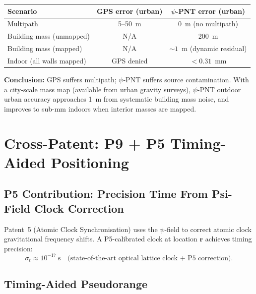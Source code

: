 \documentclass[aps,prd,twocolumn,superscriptaddress,nofootinbib]{revtex4-2}
\begin{document}
\begin{center}
\begin{tabular}{lcc}
\toprule
Scenario & GPS error (urban) & $\psi$-PNT error (urban) \\
\midrule
Multipath & 5--50~m & 0~m (no multipath) \\
Building mass (unmapped) & N/A & 200~m \\
Building mass (mapped) & N/A & $\sim 1$~m (dynamic residual) \\
Indoor (all walls mapped) & GPS denied & $< 0.31$~mm \\
\bottomrule
\end{tabular}
\end{center}

\textbf{Conclusion:} GPS suffers multipath; $\psi$-PNT suffers source
contamination.  With a city-scale mass map (available from urban
gravity surveys), $\psi$-PNT outdoor urban accuracy approaches 1~m
from systematic building mass noise, and improves to sub-mm indoors
when interior masses are mapped.

\section{Cross-Patent: P9 + P5 Timing-Aided Positioning}
\label{sec:p9p5}

\subsection{P5 Contribution: Precision Time From Psi-Field Clock Correction}

Patent~5 (Atomic Clock Synchronisation) uses the $\psi$-field to
correct atomic clock gravitational frequency shifts.  A P5-calibrated
clock at location $\mathbf{r}$ achieves timing precision:
\begin{equation}
  \sigma_t \approx 10^{-17}~\mathrm{s}
  \quad \text{(state-of-the-art optical lattice clock + P5 correction)}.
  \label{eq:sigma-t}
\end{equation}

\subsection{Timing-Aided Pseudorange}
\end{document}
